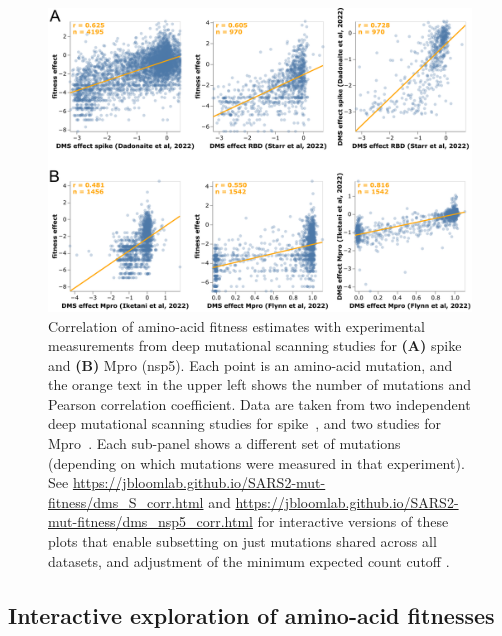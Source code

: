 \documentclass[9pt,twocolumn,twoside]{gsajnl_modified}
\begin{document}
\begin{figure}
\centering
\includegraphics[width=0.75\linewidth]{figs/dms.png}
\caption{
Correlation of amino-acid fitness estimates with experimental measurements from deep mutational scanning studies for {\bf (A)} spike and {\bf (B)} Mpro (nsp5).
Each point is an amino-acid mutation, and the orange text in the upper left shows the number of mutations and Pearson correlation coefficient.
Data are taken from two independent deep mutational scanning studies for spike~\citep{cite}, and two studies for Mpro~\citep{cite}.
Each sub-panel shows a different set of mutations (depending on which mutations were measured in that experiment).
See \url{https://jbloomlab.github.io/SARS2-mut-fitness/dms_S_corr.html} and \url{https://jbloomlab.github.io/SARS2-mut-fitness/dms_nsp5_corr.html} for interactive versions of these plots that enable subsetting on just mutations shared across all datasets, and adjustment of the minimum expected count cutoff .
\label{fig:dms_corr}
}
\end{figure}

\subsection*{Interactive exploration of amino-acid fitnesses}
\end{document}
